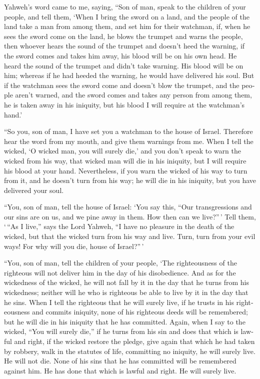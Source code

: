 \begin{paracol}{2}
\begin{otherlanguage}{english}
 Yahweh's word came to me, saying,  ``Son of
man, speak to the children of your people, and tell them, `When I bring
the sword on a land, and the people of the land take a man from among
them, and set him for their watchman,  if, when he sees
the sword come on the land, he blows the trumpet and warns the people,
 then whoever hears the sound of the trumpet and doesn't
heed the warning, if the sword comes and takes him away, his blood will
be on his own head.  He heard the sound of the trumpet and
didn't take warning. His blood will be on him; whereas if he had heeded
the warning, he would have delivered his soul.  But if the
watchman sees the sword come and doesn't blow the trumpet, and the
people aren't warned, and the sword comes and takes any person from
among them, he is taken away in his iniquity, but his blood I will
require at the watchman's hand.'

 ``So you, son of man, I have set you a watchman to the
house of Israel. Therefore hear the word from my mouth, and give them
warnings from me.  When I tell the wicked, `O wicked man,
you will surely die,' and you don't speak to warn the wicked from his
way, that wicked man will die in his iniquity, but I will require his
blood at your hand.  Nevertheless, if you warn the wicked
of his way to turn from it, and he doesn't turn from his way; he will
die in his iniquity, but you have delivered your soul.

 ``You, son of man, tell the house of Israel: `You say
this, ``Our transgressions and our sins are on us, and we pine away in
them. How then can we live?''\,'  Tell them, `\,``As I
live,'' says the Lord Yahweh, ``I have no pleasure in the death of the
wicked, but that the wicked turn from his way and live. Turn, turn from
your evil ways! For why will you die, house of Israel?''\,'

 ``You, son of man, tell the children of your people,
`The righteousness of the righteous will not deliver him in the day of
his disobedience. And as for the wickedness of the wicked, he will not
fall by it in the day that he turns from his wickedness; neither will he
who is righteous be able to live by it in the day that he sins.
 When I tell the righteous that he will surely live, if
he trusts in his righteousness and commits iniquity, none of his
righteous deeds will be remembered; but he will die in his iniquity that
he has committed.  Again, when I say to the wicked, ``You
will surely die,'' if he turns from his sin and does that which is
lawful and right,  if the wicked restore the pledge, give
again that which he had taken by robbery, walk in the statutes of life,
committing no iniquity, he will surely live. He will not die.
 None of his sins that he has committed will be
remembered against him. He has done that which is lawful and right. He
will surely live.


\end{otherlanguage}
\end{paracol}
